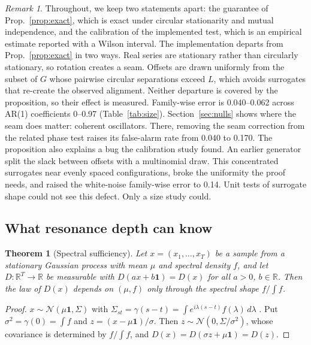 \documentclass[10pt,twocolumn,letterpaper]{article}
\newtheorem{theorem}{Theorem}
\theoremstyle{definition}
\theoremstyle{remark}
\newtheorem{remark}{Remark}
\begin{document}
\begin{remark}\label{rem:seam}
Throughout, we keep two statements apart: the guarantee of
Prop.~\ref{prop:exact}, which is exact under circular stationarity and mutual
independence, and the calibration of the implemented test, which is an
empirical estimate reported with a Wilson interval. The implementation departs
from Prop.~\ref{prop:exact} in two ways. Real
series are stationary rather than circularly stationary, so rotation creates a
seam. Offsets are drawn uniformly from the subset of $G$ whose pairwise
circular separations exceed $L$, which avoids surrogates that re-create the
observed alignment. Neither departure is covered by the proposition, so their
effect is measured. Family-wise error is 0.040--0.062 across AR(1)
coefficients 0--0.97 (Table~\ref{tab:size}). Section~\ref{sec:nulls} shows
where the seam does matter: coherent oscillators. There, removing the seam
correction from the related phase test raises its false-alarm rate from 0.040
to 0.170. The proposition also explains
a bug the calibration study found. An earlier generator split the slack
between offsets with a multinomial draw. This concentrated surrogates near
evenly spaced configurations, broke the uniformity the proof needs, and raised
the white-noise family-wise error to 0.14. Unit tests of surrogate shape could
not see this defect. Only a size study could.
\end{remark}

\subsection{What resonance depth can know}

\begin{theorem}[Spectral sufficiency]\label{thm:suff}
Let $x=(x_1,\dots,x_T)$ be a sample from a stationary Gaussian process with mean
$\mu$ and spectral density $f$, and let $D:\mathbb{R}^T\to\mathbb{R}$ be
measurable with $D(ax+b\mathbf{1})=D(x)$ for all $a>0$, $b\in\mathbb{R}$. Then
the law of $D(x)$ depends on $(\mu,f)$ only through the spectral shape
$f/\!\int f$.
\end{theorem}
\begin{proof}
$x\sim\mathcal{N}(\mu\mathbf{1},\Sigma)$ with
$\Sigma_{st}=\gamma(s-t)=\int e^{i\lambda(s-t)}f(\lambda)\,d\lambda$
\cite{brockwell}. Put $\sigma^2=\gamma(0)=\int f$ and $z=(x-\mu\mathbf{1})/\sigma$.
Then $z\sim\mathcal{N}(0,\Sigma/\sigma^2)$, whose covariance is determined by
$f/\!\int f$, and $D(x)=D(\sigma z+\mu\mathbf{1})=D(z)$.
\end{proof}
\end{document}
